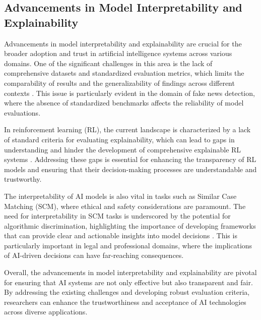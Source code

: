 \subsection{Advancements in Model Interpretability and Explainability} \label{subsec:Advancements in Model Interpretability and Explainability}



Advancements in model interpretability and explainability are crucial for the broader adoption and trust in artificial intelligence systems across various domains. One of the significant challenges in this area is the lack of comprehensive datasets and standardized evaluation metrics, which limits the comparability of results and the generalizability of findings across different contexts \cite{shu2017fakenewsdetectionsocial}. This issue is particularly evident in the domain of fake news detection, where the absence of standardized benchmarks affects the reliability of model evaluations.



In reinforcement learning (RL), the current landscape is characterized by a lack of standard criteria for evaluating explainability, which can lead to gaps in understanding and hinder the development of comprehensive explainable RL systems \cite{qing2023surveyexplainablereinforcementlearning}. Addressing these gaps is essential for enhancing the transparency of RL models and ensuring that their decision-making processes are understandable and trustworthy.



The interpretability of AI models is also vital in tasks such as Similar Case Matching (SCM), where ethical and safety considerations are paramount. The need for interpretability in SCM tasks is underscored by the potential for algorithmic discrimination, highlighting the importance of developing frameworks that can provide clear and actionable insights into model decisions \cite{lin2023interpretabilityframeworksimilarcase}. This is particularly important in legal and professional domains, where the implications of AI-driven decisions can have far-reaching consequences.



Overall, the advancements in model interpretability and explainability are pivotal for ensuring that AI systems are not only effective but also transparent and fair. By addressing the existing challenges and developing robust evaluation criteria, researchers can enhance the trustworthiness and acceptance of AI technologies across diverse applications.



